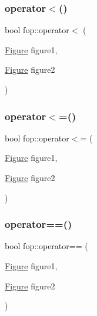 \mbox{\label{namespacefop_a848b460556a75362850867d9b567ae59}} 
\subsubsection{\texorpdfstring{operator$<$()}{operator<()}}
{\footnotesize\ttfamily bool fop\+::operator$<$ (\begin{DoxyParamCaption}\item[{\mbox{\hyperlink{classfop_1_1_figure}{Figure}}}]{figure1,  }\item[{\mbox{\hyperlink{classfop_1_1_figure}{Figure}}}]{figure2 }\end{DoxyParamCaption})}

\mbox{\label{namespacefop_a2315668c95e8c527cc00fa12d792542c}} 
\subsubsection{\texorpdfstring{operator$<$=()}{operator<=()}}
{\footnotesize\ttfamily bool fop\+::operator$<$= (\begin{DoxyParamCaption}\item[{\mbox{\hyperlink{classfop_1_1_figure}{Figure}}}]{figure1,  }\item[{\mbox{\hyperlink{classfop_1_1_figure}{Figure}}}]{figure2 }\end{DoxyParamCaption})}

\mbox{\label{namespacefop_ad4c7032872695a09038ecc2d09fef5b8}} 
\subsubsection{\texorpdfstring{operator==()}{operator==()}}
{\footnotesize\ttfamily bool fop\+::operator== (\begin{DoxyParamCaption}\item[{\mbox{\hyperlink{classfop_1_1_figure}{Figure}}}]{figure1,  }\item[{\mbox{\hyperlink{classfop_1_1_figure}{Figure}}}]{figure2 }\end{DoxyParamCaption})}

\mbox{\label{namespacefop_a1e56aa53c205088fdeba5a4ff85b211f}} 
